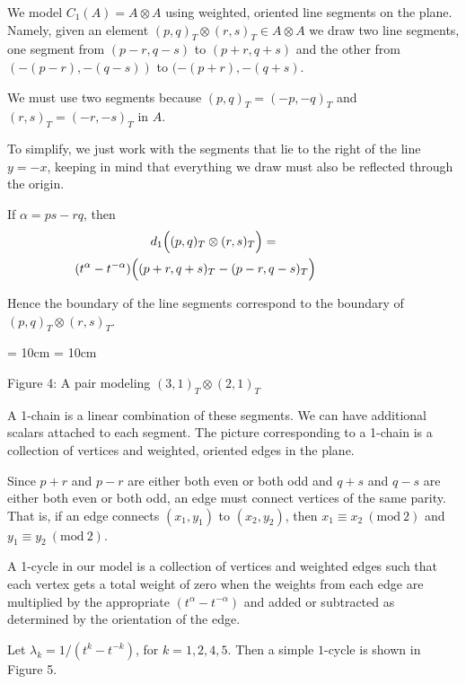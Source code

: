 \documentclass{slides}
\begin{document}
\begin{slide}
We model $C_1(A) = A \otimes A$ using
weighted, oriented line segments on the plane.
Namely, given an element $(p,q)_T \otimes (r,s)_T \in A \otimes A$
we draw two line segments, one segment from $(p-r,q-s)$ to
$(p+r,q+s)$ and the other from $(-(p-r),-(q-s))$ to
$(-(p+r),-(q+s)$.

We must use two segments because
$(p,q)_T = (-p,-q)_T$ and $(r,s)_T = (-r,-s)_T$ in $A$.

To simplify, we just work with the segments
that lie to the right of the line $y = -x$, keeping in mind
that everything we draw must also be reflected through the origin.

If $\alpha = ps - rq$, then
\begin{eqnarray}
d_1 \Big( (p,q)_T \otimes (r,s)_T \Big) & = & \nonumber \\
& & \hspace{-6cm}(t^\alpha - t^{-\alpha}) \Big( (p+r,q+s)_T - (p-r,q-s)_T \Big) \nonumber
\end{eqnarray}

Hence the boundary of the line segments correspond to the
boundary of $(p,q)_T \otimes (r,s)_T$.

\end{slide}

\begin{slide}

  \begin{center}
    \epsfxsize = 10cm
    \epsfysize = 10cm

Figure 4:  A pair modeling $(3,1)_T \otimes (2,1)_T$
  \end{center}

\end{slide}

\begin{slide}
A 1-chain is a linear combination of these segments.  We can
have additional scalars attached to each segment.  The picture
corresponding to 
a 1-chain is a collection of vertices and weighted, oriented edges
in the plane.

Since $p+r$ and $p-r$ are either both even or both
odd and $q+s$ and $q-s$ are either both even or both odd,
an edge must connect vertices of the same parity.  That is, if an
edge connects $(x_1,y_1)$ to $(x_2,y_2)$, then
$x_1 \equiv x_2~(\mathrm{mod~2})$ and $y_1 \equiv y_2~(\mathrm{mod~2})$.

A 1-cycle in our model is a collection of
vertices and weighted edges such that each vertex
gets a total weight of zero when the weights from each edge
are multiplied by the appropriate $(t^\alpha - t^{-\alpha})$
and added or subtracted as determined by the orientation of the edge. 

Let $\lambda_k = 1 / (t^k - t^{-k})$, for $k = 1, 2, 4, 5$.  Then
a simple $1$-cycle is shown in Figure 5.
\end{slide}
\end{document}
